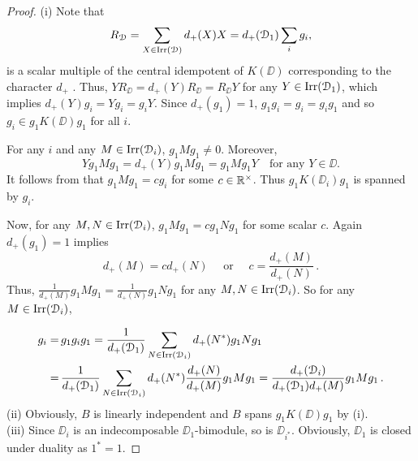 \documentclass{amsart}
\begin{document}
\begin{proof}
(i) Note that  
$$
R_{\EuScript{D}} = \sum_{X \in {\operatorname{Irr}({\EuScript{D}})}} d_+(X)X = d_+({\EuScript{D}}_1)\sum_i g_i, 
$$
is a scalar multiple of the central idempotent of $K(\DD)$ corresponding to the character $d_+$ \cite[Prop. 3.3.11]{EGNO}. Thus, $
Y R_\DD =  d_+(Y) R_\DD = R_\DD Y$
for any $Y \in \operatorname{Irr}({\EuScript{D}}_1)$, which implies  ${d_+}(Y) g_i = Y g_i = g_i Y$. Since $d_+(g_1)=1$, $g_1  g_i = g_i = g_i g_1$ and so $g_i \in g_1 K(\DD) g_1$ for all $i$.

 For any $i$ and any $M \in \operatorname{Irr}({\EuScript{D}}_i)$, $g_1 M g_1 \ne 0$. Moreover, 
 $$
 Yg_1 M g_1  = d_+(Y) g_1 M g_1 = g_1 M g_1 Y\quad \text{for any }Y  \in \DD.
$$
  It follows from \cite[Props. 7.72 and 3.44]{EGNO} that $g_1 M g_1 = c g_i$ for some $c \in \mathbb{R}^\times$. Thus $g_1 K(\DD_i) g_1$ is spanned by $g_i$.

Now, for any $M, N \in \operatorname{Irr}({\EuScript{D}}_i)$, $g_1 M g_1 = c g_1 N g_1$ for some scalar $c$. Again ${d_+}(g_1)=1$ implies
$$
{d_+}(M) = c {d_+}(N) \quad \text{ or } \quad c = \frac{{d_+}(M)}{{d_+}(N)}\,.
$$
Thus, $\frac{1}{{d_+}(M)} g_1 M g_1 = \frac{1}{{d_+}(N)} g_1 N g_1$ for any $M, N \in \operatorname{Irr}({\EuScript{D}}_i)$. So for any $M \in \operatorname{Irr}({\EuScript{D}}_i)$,

\begin{align*}
   g_i = &\, g_1 g_i g_1  =  \frac{1}{{d_+}({\EuScript{D}}_1)}\sum_{N \in \operatorname{Irr}({\EuScript{D}}_i)} {d_+}(N^*) g_1 N g_1 \\ 
   = &\,
   \frac{1}{{d_+}({\EuScript{D}}_1)}\sum_{N \in \operatorname{Irr}({\EuScript{D}}_i)} {d_+}(N^*) \frac{{d_+}(N)}{{d_+}(M)} g_1 M g_1
=  \frac{{d_+}({\EuScript{D}}_i)}{{d_+}({\EuScript{D}}_1) {d_+}(M)} g_1 M g_1\,. 
\end{align*}
(ii) Obviously, $B$ is linearly independent and  $B$ spans $g_1K(\DD)g_1$ by (i).\\
(iii) Since $\DD_i$ is an indecomposable $\DD_1$-bimodule, so is $\DD_{i^*}$. Obviously, $\DD_1$ is closed under duality as $1^*=1$.


\end{proof}
\end{document}
